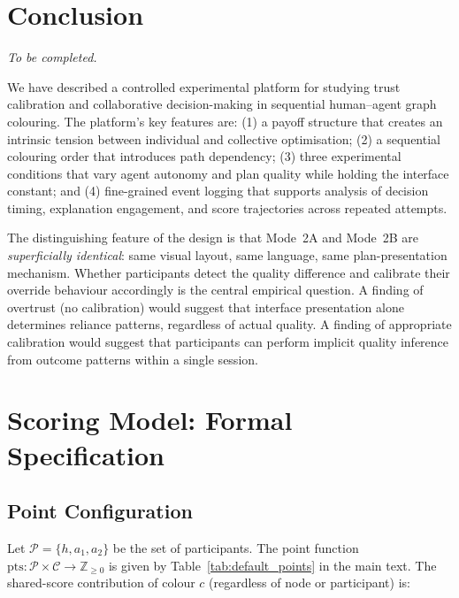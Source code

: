 \documentclass[11pt]{article}
\theoremstyle{definition}
\begin{document}
\section{Conclusion}
\label{sec:conclusion}

\textit{To be completed.}

We have described a controlled experimental platform for studying trust calibration and
collaborative decision-making in sequential human--agent graph colouring.  The platform's
key features are: (1) a payoff structure that creates an intrinsic tension between
individual and collective optimisation; (2) a sequential colouring order that introduces
path dependency; (3) three experimental conditions that vary agent autonomy and plan
quality while holding the interface constant; and (4) fine-grained event logging that
supports analysis of decision timing, explanation engagement, and score trajectories
across repeated attempts.

The distinguishing feature of the design is that Mode~2A and Mode~2B are
\emph{superficially identical}: same visual layout, same language, same plan-presentation
mechanism.  Whether participants detect the quality difference and calibrate their
override behaviour accordingly is the central empirical question.  A finding of overtrust
(no calibration) would suggest that interface presentation alone determines reliance
patterns, regardless of actual quality.  A finding of appropriate calibration would
suggest that participants can perform implicit quality inference from outcome patterns
within a single session.




\clearpage
\appendix
\renewcommand{\thesection}{\Alph{section}}

\section{Scoring Model: Formal Specification}
\label{app:scoring}

\subsection{Point Configuration}

Let $\mathcal{P} = \{h, a_1, a_2\}$ be the set of participants.  The point function
$\text{pts} : \mathcal{P} \times \mathcal{C} \to \mathbb{Z}_{\geq 0}$ is given by
Table~\ref{tab:default_points} in the main text.  The shared-score contribution of
colour $c$ (regardless of node or participant) is:
\end{document}
